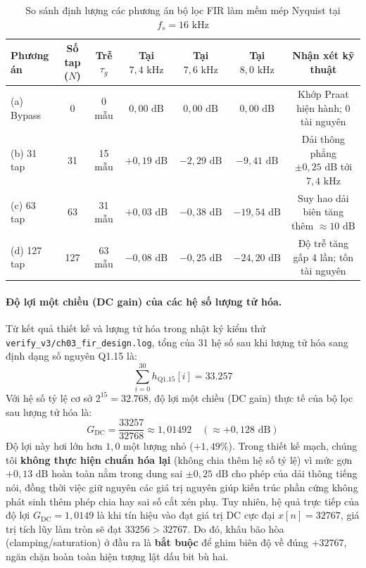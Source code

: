 \begin{table}[htbp]
\centering
\footnotesize
\setlength{\tabcolsep}{3.5pt}
\caption{So sánh định lượng các phương án bộ lọc FIR làm mềm mép Nyquist tại $f_s = 16\text{ kHz}$}
\label{tab:ch03_fir_options}
\begin{tabular}{lcccccc}
\toprule
Phương án & Số tap ($N$) & Trễ $\tau_g$ & Tại $7{,}4\text{ kHz}$ & Tại $7{,}6\text{ kHz}$ & Tại $8{,}0\text{ kHz}$ & Nhận xét kỹ thuật \\
\midrule
(a) Bypass & 0 & 0 mẫu & $0{,}00\text{ dB}$ & $0{,}00\text{ dB}$ & $0{,}00\text{ dB}$ & Khớp Praat hiện hành; 0 tài nguyên \\
(b) 31 tap & 31 & 15 mẫu & $+0{,}19\text{ dB}$ & $-2{,}29\text{ dB}$ & $-9{,}41\text{ dB}$ & Dải thông phẳng $\pm 0{,}25\text{ dB}$ tới $7{,}4\text{ kHz}$ \\
(c) 63 tap & 63 & 31 mẫu & $+0{,}03\text{ dB}$ & $-0{,}38\text{ dB}$ & $-19{,}54\text{ dB}$ & Suy hao dải biên tăng thêm $\approx 10\text{ dB}$ \\
(d) 127 tap & 127 & 63 mẫu & $-0{,}08\text{ dB}$ & $-0{,}25\text{ dB}$ & $-24{,}20\text{ dB}$ & Độ trễ tăng gấp 4 lần; tốn tài nguyên \\
\bottomrule
\end{tabular}
\end{table}

\paragraph{Độ lợi một chiều (DC gain) của các hệ số lượng tử hóa.}
Từ kết quả thiết kế và lượng tử hóa trong nhật ký kiểm thử \texttt{verify\_v3/ch03\_fir\_design.log}, tổng của 31 hệ số sau khi lượng tử hóa sang định dạng số nguyên Q1.15 là:
\begin{equation}
\sum_{i=0}^{30} h_{\text{Q1.15}}[i] = 33.257
\end{equation}
Với hệ số tỷ lệ cơ sở $2^{15} = 32.768$, độ lợi một chiều (DC gain) thực tế của bộ lọc sau lượng tử hóa là:
\begin{equation}
G_{\text{DC}} = \frac{33257}{32768} \approx 1{,}01492 \quad \left(\approx +0{,}128\text{ dB}\right)
\end{equation}
Độ lợi này hơi lớn hơn $1{,}0$ một lượng nhỏ ($+1{,}49\%$). Trong thiết kế mạch, chúng tôi \textbf{không thực hiện chuẩn hóa lại} (không chia thêm hệ số tỷ lệ) vì mức gợn $+0{,}13\text{ dB}$ hoàn toàn nằm trong dung sai $\pm 0{,}25\text{ dB}$ cho phép của dải thông tiếng nói, đồng thời việc giữ nguyên các giá trị nguyên giúp kiến trúc phần cứng không phát sinh thêm phép chia hay sai số cắt xén phụ. Tuy nhiên, hệ quả trực tiếp của độ lợi $G_{\text{DC}} = 1{,}0149$ là khi tín hiệu vào đạt giá trị DC cực đại $x[n] = 32767$, giá trị tích lũy làm tròn sẽ đạt $33256 > 32767$. Do đó, khâu bão hòa (clamping/saturation) ở đầu ra là \textbf{bắt buộc} để ghim biên độ về đúng $+32767$, ngăn chặn hoàn toàn hiện tượng lật dấu bit bù hai.

